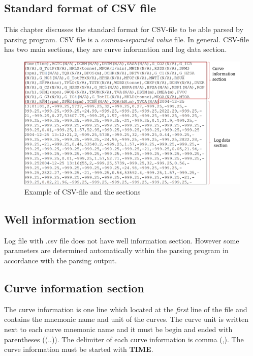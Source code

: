 \documentclass[12pt,a4paper,oneside]{report}
\begin{document}
\begin{appendices}
\chapter{Standard format of CSV file}
\label{ch:csv_std}
This chapter discusses the standard format for CSV-file to be able parsed by parsing program. CSV file is a \emph{comma-separated value} file. In general. CSV-file has two main sections, they are curve information and log data section.

\begin{figure}[ht]
\centering
\includegraphics[width=\textwidth]{csv_example.png}
\caption{Example of CSV-file and the sections}
\end{figure}


\section{Well information section}
Log file with .csv file does not have well information section. However some parameters are determined automatically within the parsing program in accordance with the parsing output.

\section{Curve information section}
The curve information is one line which located at the \emph{first} line of the file and contains the mnemonic name and unit of the curves. The curve unit is written next to each curve mnemonic name and it must be begin and ended with parentheses ((..)). The delimiter of each curve information is comma (,). The curve information must be started with \textbf{TIME}.

\end{appendices}
\end{document}
